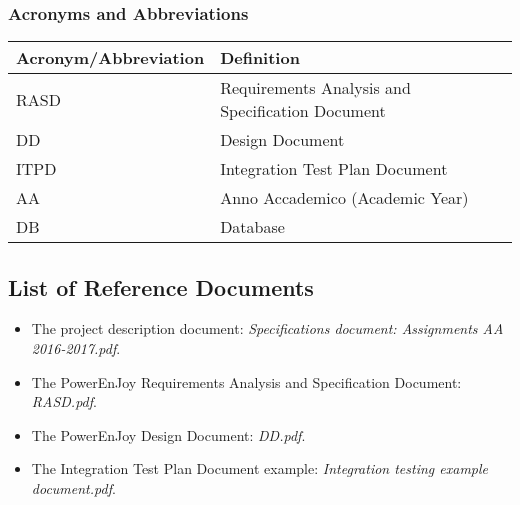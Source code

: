 \subsubsection{Acronyms and Abbreviations}
\begin{center}
	\begin{tabular} { | m{5cm} | m{8cm} | }
		\hline
		\textbf{Acronym/Abbreviation} & \textbf{Definition}\\
		\hline
		RASD & Requirements Analysis and Specification Document\\
		\hline
		DD & Design Document\\
		\hline
		ITPD & Integration Test Plan Document\\
		\hline
		AA & Anno Accademico (Academic Year)\\
		\hline
		DB & Database\\
		\hline
	\end{tabular}
\end{center}

\subsection{List of Reference Documents}
\begin{itemize}
	\item The project description document: \textit{Specifications document: Assignments AA 2016-2017.pdf}.
	\item The PowerEnJoy Requirements Analysis and Specification Document: \textit{RASD.pdf}.
	\item The PowerEnJoy Design Document: \textit{DD.pdf}.
	\item The Integration Test Plan Document example: \textit{Integration testing example document.pdf}.
\end{itemize}